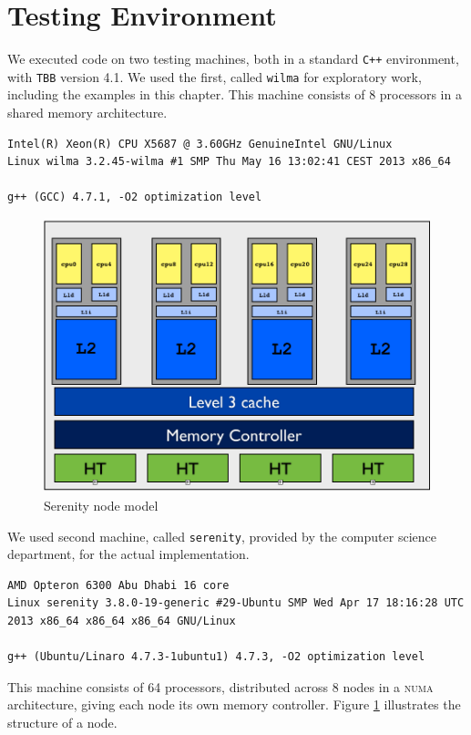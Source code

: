 \documentclass[a4paper,11pt, oneside]{report}
\newcommand{\code}[1]{\texttt{#1}}
\newcommand{\acro}[1]{\textsc{#1}}
\begin{document}
\section{Testing Environment} We executed code on two testing machines, both in a standard \code{C++} environment, with \code{TBB} version 4.1. We used the first, called \code{wilma} for exploratory work, including the examples in this chapter. This machine consists of 8 processors in a shared memory architecture.
\begin{verbatim}
Intel(R) Xeon(R) CPU X5687 @ 3.60GHz GenuineIntel GNU/Linux
Linux wilma 3.2.45-wilma #1 SMP Thu May 16 13:02:41 CEST 2013 x86_64

g++ (GCC) 4.7.1, -O2 optimization level
\end{verbatim}
\begin{figure}[hbp]
	\centering
	\includegraphics[width=\columnwidth]{serenity-node.png}
	\caption{Serenity node model \cite{serenity}} \label{fig:serenity-node}
\end{figure}
We used second machine, called \code{serenity}, provided by the computer science department, for the actual implementation.
\begin{verbatim}
AMD Opteron 6300 Abu Dhabi 16 core
Linux serenity 3.8.0-19-generic #29-Ubuntu SMP Wed Apr 17 18:16:28 UTC
2013 x86_64 x86_64 x86_64 GNU/Linux

g++ (Ubuntu/Linaro 4.7.3-1ubuntu1) 4.7.3, -O2 optimization level
\end{verbatim}

This machine consists of 64 processors, distributed across 8 nodes in a \acro{numa} architecture, giving each node its own memory controller. Figure \ref{fig:serenity-node} illustrates the structure of a node.
\end{document}

